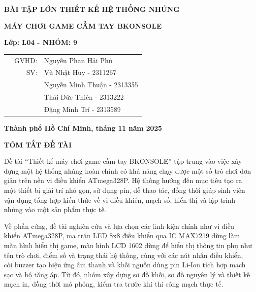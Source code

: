 \documentclass[12pt, a4paper, oneside]{article}
\begin{document}
\begin{titlepage}
\begin{center}
    \fontsize{18pt}{17pt}\selectfont 
    \textbf{BÀI TẬP LỚN THIẾT KẾ HỆ THỐNG NHÚNG}
\end{center}
\begin{center}
    \fontsize{15pt}{17pt}\selectfont 
    \textbf{\textrm{MÁY CHƠI GAME CẦM TAY BKONSOLE}}
\end{center}

\begin{center}
    \vspace{15pt}
\textbf{Lớp: L04 - NHÓM: 9}
\end{center}

\vspace{10pt}

\begin{table}[h]
\begin{tabular}{rrl}
\hspace{5 cm} & GVHD: &Nguyễn Phan Hải Phú\\
& SV: & Vũ Nhật Huy - 2311267\\
& & Nguyễn Minh Thuận - 2313355 \\
& & Thái Đức Thiên - 2313222\\
& & Đặng Minh Trí - 2313589 \\
\end{tabular}
\end{table}
\vfill
\centerline{\bf Thành phố Hồ Chí Minh, tháng 11 năm 2025}

\vspace{1cm}
\end{titlepage}
\newpage
\thispagestyle{empty}
\begin{center}
    {\color{red}\Large{\textbf{TÓM TẮT ĐỀ TÀI}}}
\end{center}

Đề tài “Thiết kế máy chơi game cầm tay BKONSOLE” tập trung vào việc xây dựng một hệ thống nhúng hoàn chỉnh có khả năng chạy được một số trò chơi đơn giản trên nền vi điều khiển ATmega328P. Hệ thống hướng đến mục tiêu tạo ra một thiết bị giải trí nhỏ gọn, sử dụng pin, dễ thao tác, đồng thời giúp sinh viên vận dụng tổng hợp kiến thức về vi điều khiển, mạch số, hiển thị và lập trình nhúng vào một sản phẩm thực tế.

Về phần cứng, đề tài nghiên cứu và lựa chọn các linh kiện chính như vi điều khiển ATmega328P, ma trận LED 8x8 điều khiển qua IC MAX7219 dùng làm màn hình hiển thị game, màn hình LCD 1602 dùng để hiển thị thông tin phụ như tên trò chơi, điểm số và trạng thái hệ thống, cùng với các nút nhấn điều khiển, còi buzzer tạo hiệu ứng âm thanh và khối nguồn dùng pin Li-Ion tích hợp mạch sạc và bộ tăng áp. Từ đó, nhóm xây dựng sơ đồ khối, sơ đồ nguyên lý và thiết kế mạch in, đồng thời mô phỏng, kiểm tra trước khi thi công mạch thực tế.
\end{document}
